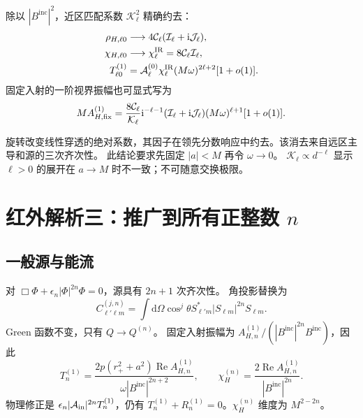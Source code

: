 \documentclass[UTF8,fontset=fandol,11pt,a4paper]{ctexart}
\newcommand{\ii}{\mathrm{i}}
\newcommand{\dd}{\mathrm{d}}
\newcommand{\Rea}{\operatorname{Re}}
\newcommand{\Bin}{B^{\mathrm{inc}}}
\numberwithin{equation}{section}
\begin{document}
除以 $|\Bin|^2$，近区匹配系数 $\mathcal K_\ell^2$ 精确约去：
\begin{align}
\rho_{H,\ell0}&\longrightarrow4\mathcal C_\ell(\mathcal I_\ell+\ii\mathcal J_\ell),\\
\chi_{H,\ell0}&\longrightarrow\chi_\ell^{\rm IR}=8\mathcal C_\ell\mathcal I_\ell,\\
T^{(1)}_{\ell0}&=\mathcal A_\ell^{(0)}\chi_\ell^{\rm IR}(M\omega)^{2\ell+2}[1+o(1)].
\end{align}
固定入射的一阶视界振幅也可显式写为
\begin{equation}
M A_{H,\rm fix}^{(1)}=\frac{8\mathcal C_\ell}{\mathcal K_\ell}\ii^{-\ell-1}
(\mathcal I_\ell+\ii\mathcal J_\ell)(M\omega)^{\ell+1}[1+o(1)].
\end{equation}
\begin{remarkbox}
旋转改变线性穿透的绝对系数，其因子在领先分数响应中约去。该消去来自远区主导和源的三次齐次性。
此结论要求先固定 $|a|<M$ 再令 $\omega\to0$。
$\mathcal K_\ell\propto d^{-\ell}$ 显示 $\ell>0$ 的展开在 $a\to M$ 时不一致；不可随意交换极限。
\end{remarkbox}

\section{红外解析三：推广到所有正整数 \texorpdfstring{$n$}{n}}
\subsection{一般源与能流}
对 $\Box\Phi+\epsilon_n|\Phi|^{2n}\Phi=0$，源具有 $2n+1$ 次齐次性。
角投影替换为
\begin{equation}
C^{(j,n)}_{\ell'\ell m}=\int\dd\Omega\cos^j\theta S_{\ell'm}^*|S_{\ell m}|^{2n}S_{\ell m}.
\end{equation}
Green 函数不变，只有 $Q\to Q^{(n)}$。
固定入射振幅为 $A_{H,n}^{(1)}/(|\Bin|^{2n}\Bin)$，因此
\begin{equation}
T_n^{(1)}=\frac{2p(r_+^2+a^2)\Rea A_{H,n}^{(1)}}{\omega|\Bin|^{2n+2}},\qquad
\chi_H^{(n)}=\frac{2\Rea A_{H,n}^{(1)}}{|\Bin|^{2n}}.
\end{equation}
物理修正是 $\epsilon_n|\mathcal A_{\rm in}|^{2n}T_n^{(1)}$，仍有
$T_n^{(1)}+R_n^{(1)}=0$。$\chi_H^{(n)}$ 维度为 $M^{2-2n}$。
\end{document}
